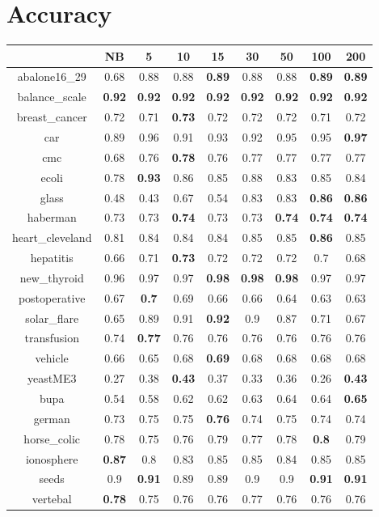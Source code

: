 \documentclass{article}%
\begin{document}
%
\normalsize%
\section*{Accuracy}%
\begin{tabular}{c|cccccccc}%
\hline%
&NB&5&10&15&30&50&100&200\\%
\hline%
abalone16\_29&0.68&0.88&0.88&\textbf{0.89}&0.88&0.88&\textbf{0.89}&\textbf{0.89}\\%
\hline%
balance\_scale&\textbf{0.92}&\textbf{0.92}&\textbf{0.92}&\textbf{0.92}&\textbf{0.92}&\textbf{0.92}&\textbf{0.92}&\textbf{0.92}\\%
\hline%
breast\_cancer&0.72&0.71&\textbf{0.73}&0.72&0.72&0.72&0.71&0.72\\%
\hline%
car&0.89&0.96&0.91&0.93&0.92&0.95&0.95&\textbf{0.97}\\%
\hline%
cmc&0.68&0.76&\textbf{0.78}&0.76&0.77&0.77&0.77&0.77\\%
\hline%
ecoli&0.78&\textbf{0.93}&0.86&0.85&0.88&0.83&0.85&0.84\\%
\hline%
glass&0.48&0.43&0.67&0.54&0.83&0.83&\textbf{0.86}&\textbf{0.86}\\%
\hline%
haberman&0.73&0.73&\textbf{0.74}&0.73&0.73&\textbf{0.74}&\textbf{0.74}&\textbf{0.74}\\%
\hline%
heart\_cleveland&0.81&0.84&0.84&0.84&0.85&0.85&\textbf{0.86}&0.85\\%
\hline%
hepatitis&0.66&0.71&\textbf{0.73}&0.72&0.72&0.72&0.7&0.68\\%
\hline%
new\_thyroid&0.96&0.97&0.97&\textbf{0.98}&\textbf{0.98}&\textbf{0.98}&0.97&0.97\\%
\hline%
postoperative&0.67&\textbf{0.7}&0.69&0.66&0.66&0.64&0.63&0.63\\%
\hline%
solar\_flare&0.65&0.89&0.91&\textbf{0.92}&0.9&0.87&0.71&0.67\\%
\hline%
transfusion&0.74&\textbf{0.77}&0.76&0.76&0.76&0.76&0.76&0.76\\%
\hline%
vehicle&0.66&0.65&0.68&\textbf{0.69}&0.68&0.68&0.68&0.68\\%
\hline%
yeastME3&0.27&0.38&\textbf{0.43}&0.37&0.33&0.36&0.26&\textbf{0.43}\\%
\hline%
bupa&0.54&0.58&0.62&0.62&0.63&0.64&0.64&\textbf{0.65}\\%
\hline%
german&0.73&0.75&0.75&\textbf{0.76}&0.74&0.75&0.74&0.74\\%
\hline%
horse\_colic&0.78&0.75&0.76&0.79&0.77&0.78&\textbf{0.8}&0.79\\%
\hline%
ionosphere&\textbf{0.87}&0.8&0.83&0.85&0.85&0.84&0.85&0.85\\%
\hline%
seeds&0.9&\textbf{0.91}&0.89&0.89&0.9&0.9&\textbf{0.91}&\textbf{0.91}\\%
\hline%
vertebal&\textbf{0.78}&0.75&0.76&0.76&0.77&0.76&0.76&0.76\\%
\hline%
\end{tabular}
\end{document}
